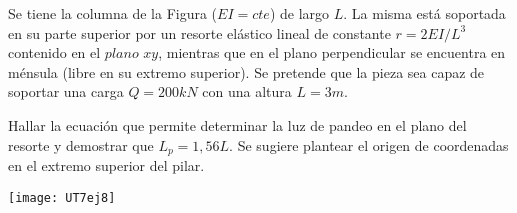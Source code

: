 \ejercicio

Se tiene la columna de la Figura ($EI=cte$) de largo $L$. La misma está soportada en su parte superior por un resorte elástico lineal de constante $r=2EI/L^3$ contenido en el $plano$ $xy$, mientras que en el plano perpendicular se encuentra en ménsula (libre en su extremo superior). Se pretende que la pieza sea capaz de soportar una carga $Q=200 kN$ con una altura $L=3m$.

Hallar la ecuación que permite determinar la luz de pandeo en el plano del resorte y demostrar que $L_p=1,56L$. Se sugiere plantear el origen de coordenadas en el extremo superior del pilar.

%

\begin{center}
	\texttt{[image: UT7ej8]}
\end{center}

%
%
%
%
%

